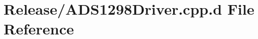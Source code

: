 \hypertarget{_release_2_a_d_s1298_driver_8cpp_8d}{\section{\-Release/\-A\-D\-S1298\-Driver.cpp.\-d \-File \-Reference}
\label{_release_2_a_d_s1298_driver_8cpp_8d}
}

